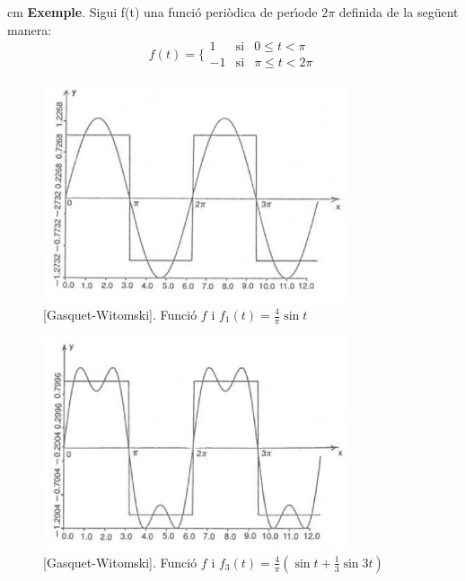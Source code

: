 \documentclass{article}
\begin{document}
 cm
\noindent
{\bf Exemple}. Sigui f(t) una funci\'o peri\`odica de per\'\i ode $2\pi$
definida de la seg\"uent manera:
\[
f(t)=\lbrace  
\begin{array}{ccc}
1 & \mathrm{si} & 0 \leq t < \pi\\
-1 & \mathrm{si} & \pi \leq t < 2\pi
\end{array}
\]

\begin{figure}
\begin{center}
\includegraphics[width=9cm]{imatges/exserie1.eps}
\caption{[Gasquet-Witomski]. Funci\'o $f$ i $f_1(t)=\frac{4}{\pi} \sin t$}
\end{center}
\end{figure}

\begin{figure}
\begin{center}
\includegraphics[width=9cm]{imatges/exserie2.eps}
\caption{[Gasquet-Witomski]. Funci\'o $f$ i 
$f_3(t)=\frac{4}{\pi} (\sin t + \frac{1}{3} \sin 3t)$}
\end{center}
\end{figure}
\end{document}
